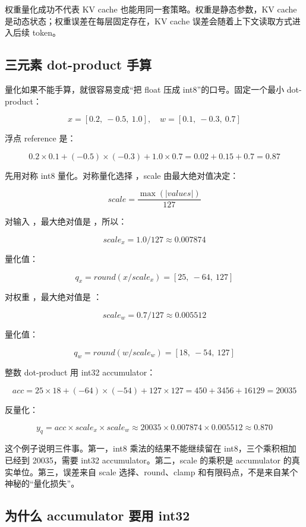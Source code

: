 \begin{warningbox}
权重量化成功不代表 KV cache 也能用同一套策略。权重是静态参数，KV cache 是动态状态；权重误差在每层固定存在，KV cache 误差会随着上下文读取方式进入后续 token。
\end{warningbox}

\subsection{三元素 dot-product 手算}

量化如果不能手算，就很容易变成“把 float 压成 int8”的口号。固定一个最小 dot-product：

\[
x = [0.2,\ -0.5,\ 1.0], \quad
w = [0.1,\ -0.3,\ 0.7]
\]

浮点 reference 是：

\[
0.2 \times 0.1 + (-0.5) \times (-0.3) + 1.0 \times 0.7
= 0.02 + 0.15 + 0.7 = 0.87
\]

先用对称 int8 量化。对称量化选择 ，scale 由最大绝对值决定：

\[
scale = \frac{\max(|values|)}{127}
\]

对输入 ，最大绝对值是 ，所以：

\[
scale_x = 1.0 / 127 \approx 0.007874
\]

量化值：

\[
q_x = round(x / scale_x) = [25,\ -64,\ 127]
\]

对权重 ，最大绝对值是 ：

\[
scale_w = 0.7 / 127 \approx 0.005512
\]

量化值：

\[
q_w = round(w / scale_w) = [18,\ -54,\ 127]
\]

整数 dot-product 用 int32 accumulator：

\[
acc = 25 \times 18 + (-64) \times (-54) + 127 \times 127
= 450 + 3456 + 16129 = 20035
\]

反量化：

\[
y_q = acc \times scale_x \times scale_w
\approx 20035 \times 0.007874 \times 0.005512
\approx 0.870
\]

这个例子说明三件事。第一，int8 乘法的结果不能继续留在 int8，三个乘积相加已经到 20035，需要 int32 accumulator。第二，scale 的乘积是 accumulator 的真实单位。第三，误差来自 scale 选择、round、clamp 和有限码点，不是来自某个神秘的“量化损失”。

\subsection{为什么 accumulator 要用 int32}

